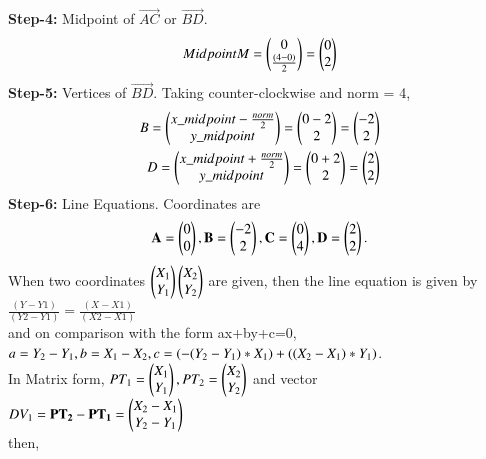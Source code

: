 \documentclass[journal,12pt,twocolumn]{IEEEtran}
\begin{document}
\textbf{Step-4:} Midpoint of $\vec{AC}$ or $\vec{BD}$.
\\
\begin{align}
\begin{split}
Midpoint M = \begin{pmatrix}0 \\ \frac{(4-0)}{2}\end{pmatrix} = \begin{pmatrix}0\\2\end{pmatrix}
\end{split}
\end{align}
\textbf{Step-5:} Vertices of $\vec{BD}$.
Taking counter-clockwise and norm = 4,
\\
\begin{align}
\begin{split}
B = \begin{pmatrix}x\_midpoint-\frac{norm}{2}\\y\_midpoint\end{pmatrix} = \begin{pmatrix}0-2\\2\end{pmatrix} = \begin{pmatrix}-2\\2\end{pmatrix}\\
D = \begin{pmatrix}x\_midpoint+\frac{norm}{2}\\y\_midpoint\end{pmatrix} = \begin{pmatrix}0+2\\2\end{pmatrix} = \begin{pmatrix}2\\2\end{pmatrix}
\end{split}
\end{align}
\textbf{Step-6:} Line Equations.
Coordinates are
\\
\begin{align}
\begin{split}
\mathbf{A} = \begin{pmatrix}0 \\ 0\end{pmatrix},
\mathbf{B} =\begin{pmatrix}-2\\2\end{pmatrix} ,
\mathbf{C} = \begin{pmatrix}0 \\ 4\end{pmatrix},
\mathbf{D} =\begin{pmatrix}2\\2\end{pmatrix}.
\end{split}
\end{align}
When two coordinates $\begin{pmatrix}X_1\\ Y_1\end{pmatrix} \begin{pmatrix}X_2 \\Y_2\end{pmatrix}$ are given, then the line equation is given by 
$\frac{(Y-Y1)}{(Y2-Y1)} = \frac{(X-X1)}{(X2-X1)}$\\
and on comparison with the form ax+by+c=0,\\ $a= Y_2-Y_1, b=X_1-X_2, \\c=(-(Y_2-Y_1)*X_1)+((X_2-X_1)*Y_1)$.\\ 
In Matrix form, $PT_1 = \begin{pmatrix}X_1\\Y_1\end{pmatrix}, PT_2 = \begin{pmatrix}X_2\\Y_2\end{pmatrix}$ and vector \\$DV_1 = \mathbf{PT_2 - PT_1} =\begin{pmatrix}X_2-X_1\\ Y_2-Y_1\end{pmatrix}$ \\then, 
\end{document}
